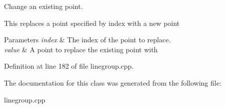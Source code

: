 Change an existing point. 

This replaces a point specified by index with a new point 
\begin{DoxyParams}{Parameters}
{\em index} & The index of the point to replace. \\
\hline
{\em value} & A point to replace the existing point with \\
\hline
\end{DoxyParams}


Definition at line 182 of file linegroup.cpp.



The documentation for this class was generated from the following file:\begin{DoxyCompactItemize}
\item 
linegroup.cpp\end{DoxyCompactItemize}

